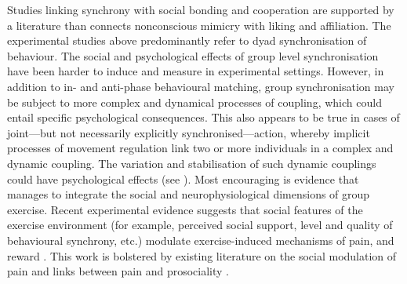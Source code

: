 Studies linking synchrony with social bonding and cooperation are supported by a literature than connects nonconscious mimicry with liking and affiliation\citep{VanBaaren2009}.  The experimental studies above predominantly refer to dyad synchronisation of behaviour.  The social and psychological effects of group level synchronisation have been harder to induce and measure in experimental settings. However, in addition to in- and anti-phase behavioural matching, group synchronisation may be subject to more complex and dynamical processes of coupling, which could entail specific psychological consequences. This also appears to be true in cases of joint---but not necessarily explicitly synchronised---action, whereby implicit processes of movement regulation link two or more individuals in a complex and dynamic coupling. The variation and stabilisation of such dynamic couplings could have psychological effects (see \citep{Schmidt2008,Marsh2009a}).  Most encouraging is evidence that manages
to integrate the social and neurophysiological dimensions of group exercise.  Recent experimental evidence suggests that social features of the exercise environment (for example, perceived social support, level and quality of behavioural synchrony, etc.) modulate exercise-induced mechanisms of pain, and reward \citep{Cohen2009,Sullivan2014,Tarr2015,Davis2015,Weinstein2016}. This work is bolstered by existing literature on the social modulation of pain \citep{Eisenberger2012a} and links between pain and prosociality \citep{Bastian2014a}.


